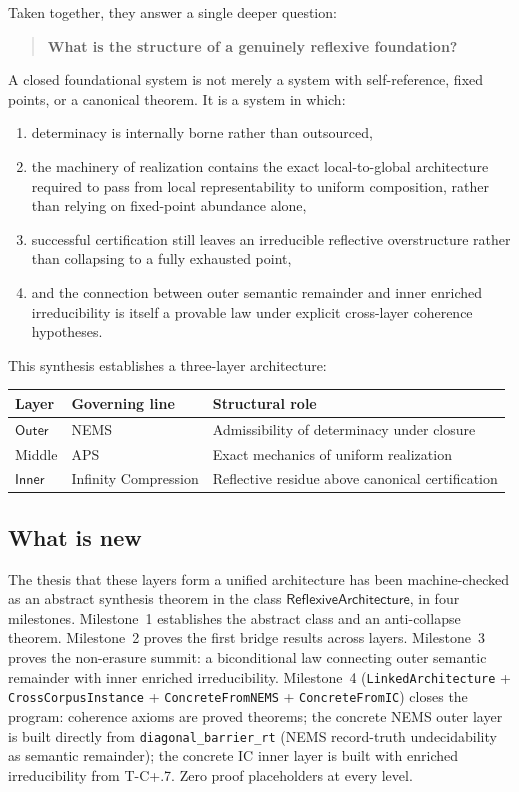 \documentclass[11pt]{article}
\newcommand{\Outer}{\ensuremath{\mathsf{Outer}}}
\newcommand{\Inner}{\ensuremath{\mathsf{Inner}}}
\newcommand{\RAL}{\ensuremath{\mathsf{ReflexiveArchitecture}}}
\begin{document}
Taken together, they answer a single deeper question:

\begin{quote}
\textbf{What is the structure of a genuinely reflexive foundation?}
\end{quote}

A closed foundational system is not merely a system with self-reference, fixed points,
or a canonical theorem.  It is a system in which:
\begin{enumerate}[leftmargin=2em]
\item determinacy is internally borne rather than outsourced,
\item the machinery of realization contains the exact local-to-global architecture
required to pass from local representability to uniform composition, rather than
relying on fixed-point abundance alone,
\item successful certification still leaves an irreducible reflective overstructure
rather than collapsing to a fully exhausted point,
\item and the connection between outer semantic remainder and inner enriched
irreducibility is itself a provable law under explicit cross-layer coherence hypotheses.
\end{enumerate}

This synthesis establishes a three-layer architecture:

\begin{center}
\begin{tabular}{lll}
\toprule
Layer & Governing line & Structural role \\
\midrule
$\Outer$ & NEMS & Admissibility of determinacy under closure \\
Middle & APS & Exact mechanics of uniform realization \\
$\Inner$ & Infinity Compression & Reflective residue above canonical certification \\
\bottomrule
\end{tabular}
\end{center}

\subsection{What is new}

The thesis that these layers form a unified architecture has been machine-checked as an
abstract synthesis theorem in the class $\RAL$, in four milestones.  Milestone~1
establishes the abstract class and an anti-collapse theorem.  Milestone~2 proves the
first bridge results across layers.  Milestone~3 proves the non-erasure summit: a
biconditional law connecting outer semantic remainder with inner enriched irreducibility.
Milestone~4 (\texttt{LinkedArchitecture} + \texttt{CrossCorpusInstance} +
\texttt{ConcreteFromNEMS} + \texttt{ConcreteFromIC}) closes the program: coherence
axioms are proved theorems; the concrete NEMS outer layer is built directly from
\texttt{diagonal\_barrier\_rt} (NEMS record-truth undecidability as semantic remainder); the concrete
IC inner layer is built with enriched irreducibility from T-C+.7.  Zero proof
placeholders at every level.
\end{document}
